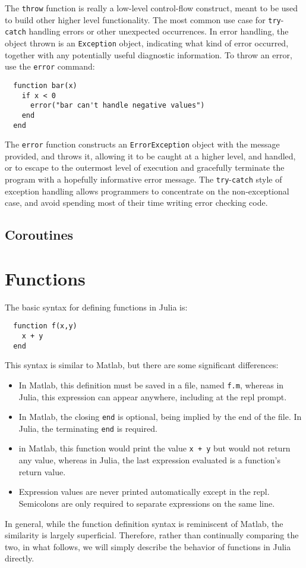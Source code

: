 \documentclass{article}
\renewcommand{\sec}[1]{\label{sec:#1}}
\begin{document}
The \verb|throw| function is really a low-level control-flow construct, meant to be used to build other higher level functionality.
The most common use case for \verb|try|-\verb|catch| handling errors or other unexpected occurrences.
In error handling, the object thrown is an \verb|Exception| object, indicating what kind of error occurred, together with any potentially useful diagnostic information.
To throw an error, use the \verb|error| command:
\begin{verbatim}
  function bar(x)
    if x < 0
      error("bar can't handle negative values")
    end
  end
\end{verbatim}
The \verb|error| function constructs an \verb|ErrorException| object with the message provided, and throws it, allowing it to be caught at a higher level, and handled, or to escape to the outermost level of execution and gracefully terminate the program with a hopefully informative error message.
The \verb|try|-\verb|catch| style of exception handling allows programmers to concentrate on the non-exceptional case, and avoid spending most of their time writing error checking code.

\subsection{Coroutines}\sec{coroutines}

\section{Functions}\sec{functions}

The basic syntax for defining functions in Julia is:
\begin{verbatim}
  function f(x,y)
    x + y
  end
\end{verbatim}
This syntax is similar to Matlab, but there are some significant differences:
\begin{itemize}
\item In Matlab, this definition must be saved in a file, named \verb|f.m|, whereas in Julia, this expression can appear anywhere, including at the repl prompt.
\item In Matlab, the closing \verb|end| is optional, being implied by the end of the file.
In Julia, the terminating \verb|end| is required.
\item in Matlab, this function would print the value \verb|x + y| but would not return any value, whereas in Julia, the last expression evaluated is a function's return value.
\item Expression values are never printed automatically except in the repl.
Semicolons are only required to separate expressions on the same line.
\end{itemize}
In general, while the function definition syntax is reminiscent of Matlab, the similarity is largely superficial.
Therefore, rather than continually comparing the two, in what follows, we will simply describe the behavior of functions in Julia directly.
\end{document}
